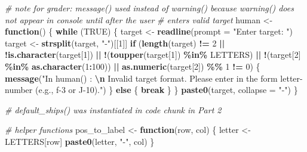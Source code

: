 \documentclass[
]{article}
\newenvironment{Shaded}{\begin{snugshade}}{\end{snugshade}}
\newcommand{\AttributeTok}[1]{\textcolor[rgb]{0.13,0.29,0.53}{#1}}
\newcommand{\CommentTok}[1]{\textcolor[rgb]{0.56,0.35,0.01}{\textit{#1}}}
\newcommand{\ConstantTok}[1]{\textcolor[rgb]{0.56,0.35,0.01}{#1}}
\newcommand{\ControlFlowTok}[1]{\textcolor[rgb]{0.13,0.29,0.53}{\textbf{#1}}}
\newcommand{\DecValTok}[1]{\textcolor[rgb]{0.00,0.00,0.81}{#1}}
\newcommand{\FunctionTok}[1]{\textcolor[rgb]{0.13,0.29,0.53}{\textbf{#1}}}
\newcommand{\NormalTok}[1]{#1}
\newcommand{\OtherTok}[1]{\textcolor[rgb]{0.56,0.35,0.01}{#1}}
\newcommand{\SpecialCharTok}[1]{\textcolor[rgb]{0.81,0.36,0.00}{\textbf{#1}}}
\newcommand{\StringTok}[1]{\textcolor[rgb]{0.31,0.60,0.02}{#1}}
\begin{document}
\begin{Shaded}
\begin{Highlighting}[]
\CommentTok{\# note for grader: message() used instead of warning() because warning() does not appear in console until after the user }
\CommentTok{\# enters valid target}
\NormalTok{human }\OtherTok{\textless{}{-}} \ControlFlowTok{function}\NormalTok{() \{ }
  \ControlFlowTok{while}\NormalTok{ (}\ConstantTok{TRUE}\NormalTok{) \{}
\NormalTok{    target }\OtherTok{\textless{}{-}} \FunctionTok{readline}\NormalTok{(}\AttributeTok{prompt =} \StringTok{"Enter target: "}\NormalTok{)}
\NormalTok{    target }\OtherTok{\textless{}{-}} \FunctionTok{strsplit}\NormalTok{(target, }\StringTok{"{-}"}\NormalTok{)[[}\DecValTok{1}\NormalTok{]]}
    \ControlFlowTok{if}\NormalTok{ (}\FunctionTok{length}\NormalTok{(target) }\SpecialCharTok{!=} \DecValTok{2} \SpecialCharTok{||} \SpecialCharTok{!}\FunctionTok{is.character}\NormalTok{(target[}\DecValTok{1}\NormalTok{]) }\SpecialCharTok{||} \SpecialCharTok{!}\NormalTok{(}\FunctionTok{toupper}\NormalTok{(target[}\DecValTok{1}\NormalTok{]) }\SpecialCharTok{\%in\%}\NormalTok{ LETTERS)}
        \SpecialCharTok{||} \SpecialCharTok{!}\NormalTok{(target[}\DecValTok{2}\NormalTok{] }\SpecialCharTok{\%in\%} \FunctionTok{as.character}\NormalTok{(}\DecValTok{1}\SpecialCharTok{:}\DecValTok{100}\NormalTok{)) }\SpecialCharTok{||} \FunctionTok{as.numeric}\NormalTok{(target[}\DecValTok{2}\NormalTok{]) }\SpecialCharTok{\%\%} \DecValTok{1} \SpecialCharTok{!=} \DecValTok{0}\NormalTok{) \{}
      \FunctionTok{message}\NormalTok{(}\StringTok{"In human() : }\SpecialCharTok{\textbackslash{}n}\StringTok{  Invalid target format. Please enter in the form \textquotesingle{}letter{-}number\textquotesingle{} (e.g., \textquotesingle{}f{-}3\textquotesingle{} or \textquotesingle{}J{-}10\textquotesingle{})."}\NormalTok{)}
\NormalTok{    \} }\ControlFlowTok{else}\NormalTok{ \{}
      \ControlFlowTok{break}
\NormalTok{    \}}
\NormalTok{  \}}
  \FunctionTok{paste0}\NormalTok{(target, }\AttributeTok{collapse =} \StringTok{"{-}"}\NormalTok{)}
\NormalTok{\}}

\CommentTok{\# default\_ships() was instantiated in code chunk in Part 2}

\CommentTok{\# helper functions}
\NormalTok{pos\_to\_label }\OtherTok{\textless{}{-}} \ControlFlowTok{function}\NormalTok{(row, col) \{}
\NormalTok{  letter }\OtherTok{\textless{}{-}}\NormalTok{ LETTERS[row]}
  \FunctionTok{paste0}\NormalTok{(letter, }\StringTok{"{-}"}\NormalTok{, col)}
\NormalTok{\}}


\end{Highlighting}
\end{Shaded}
\end{document}

